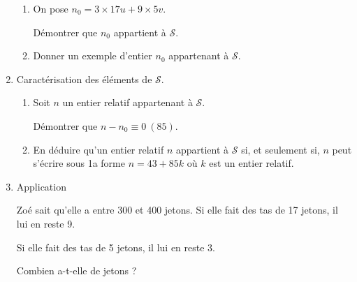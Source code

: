 \documentclass{cornouaille}
\begin{document}
\begin{exercice}
\begin{enumerate}
\begin{enumerate}
\item On pose $n_0=3\times17u+9\times5v$.

Démontrer que $n_0$ appartient à $\mathcal{S}$.

\item Donner un exemple d'entier $n_0$ appartenant à $\mathcal{S}$.
\end{enumerate}

\item Caractérisation des éléments de $\mathcal{S}$.
\begin{enumerate}
\item Soit $n$ un entier relatif appartenant à $\mathcal{S}$.
 
Démontrer que $n-n_0\equiv0~(85)$.

\item En déduire qu'un entier relatif $n$ appartient à $\mathcal{S}$
  si, et seulement si, $n$ peut s'écrire sous 1a forme $n=43+85k$ où
  $k$ est un entier relatif.
\end{enumerate}

\item Application

Zoé sait qu'elle a entre 300 et 400 jetons. Si elle fait des tas de 17
jetons, il lui en reste 9. 

Si elle fait des tas de 5 jetons, il lui en reste 3.

Combien a-t-elle de jetons ?
\end{enumerate}
\end{exercice}



\end{document}
